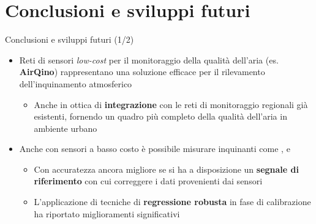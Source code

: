 \section{Conclusioni e sviluppi futuri}
\begin{frame}{Conclusioni e sviluppi futuri (1/2)}
\begin{itemize}
  \item Reti di sensori \textit{low-cost} per il monitoraggio della qualità dell'aria (es. \textbf{AirQino}) rappresentano una soluzione efficace per il rilevamento dell'inquinamento atmosferico\vspace{0.2cm}
  \begin{itemize}
    \item Anche in ottica di \textbf{integrazione} con le reti di monitoraggio regionali già esistenti, fornendo un quadro più completo della qualità dell'aria in ambiente urbano
  \end{itemize}\vspace{0.2cm}
  \item Anche con sensori a basso costo è possibile misurare inquinanti come ,  e \vspace{0.2cm}
  \begin{itemize}
    \item Con accuratezza ancora migliore se si ha a disposizione un \textbf{segnale di riferimento} con cui correggere i dati provenienti dai sensori\vspace{0.1cm}
    \item L'applicazione di tecniche di \textbf{regressione robusta} in fase di calibrazione ha riportato miglioramenti significativi
  \end{itemize}
\end{itemize}
\end{frame}

